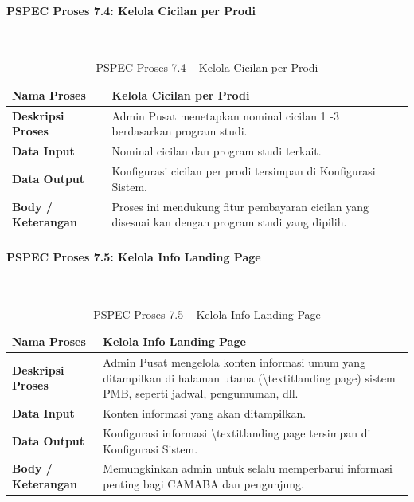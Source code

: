 \paragraph{PSPEC Proses 7.4: Kelola Cicilan per Prodi}~\\
\begin{longtable}{|p{}|p{}|}
	\caption{PSPEC Proses 7.4 -- Kelola Cicilan per Prodi}
	\label{table:3.pspec74}\\
	\hline
	\textbf{Nama Proses} & Kelola Cicilan per Prodi \\
	\hline
	\textbf{Deskripsi Proses} & Admin Pusat menetapkan nominal cicilan 1 -3 berdasarkan program studi. \\
	\hline
	\textbf{Data Input} & Nominal cicilan dan program studi terkait. \\
	\hline
	\textbf{Data Output} & Konfigurasi cicilan per prodi tersimpan di Konfigurasi Sistem. \\
	\hline
	\textbf{Body / Keterangan} & Proses ini mendukung fitur pembayaran cicilan yang disesuai kan dengan program studi yang dipilih. \\
	\hline
\end{longtable}

\paragraph{PSPEC Proses 7.5: Kelola Info Landing Page}~\\
\begin{longtable}{|p{}|p{}|}
	\caption{PSPEC Proses 7.5 -- Kelola Info Landing Page}
	\label{table:3.pspec75}\\
	\hline
	\textbf{Nama Proses} & Kelola Info Landing Page \\
	\hline
	\textbf{Deskripsi Proses} & Admin Pusat mengelola konten informasi umum yang ditampilkan di halaman utama (\textbackslash{}textit{landing page}) sistem PMB, seperti jadwal, pengumuman, dll. \\
	\hline
	\textbf{Data Input} & Konten informasi yang akan ditampilkan. \\
	\hline
	\textbf{Data Output} & Konfigurasi informasi \textbackslash{}textit{landing page} tersimpan di Konfigurasi Sistem. \\
	\hline
	\textbf{Body / Keterangan} & Memungkinkan admin untuk selalu memperbarui informasi penting bagi CAMABA dan pengunjung. \\
	\hline
\end{longtable}

